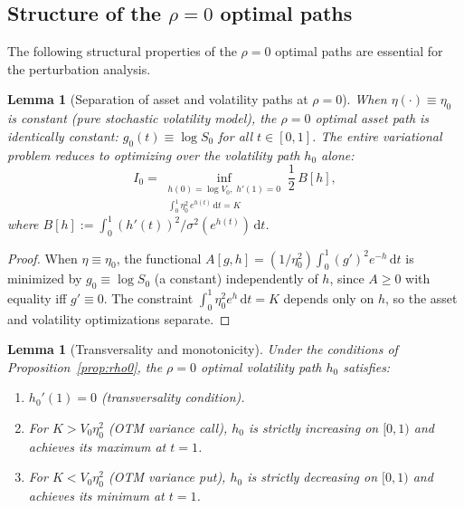 \documentclass[11pt]{article}
\newtheorem{lemma}[theorem]{Lemma}
\theoremstyle{definition}
\newcommand{\dd}{\mathrm{d}}
\begin{document}
\subsection{Structure of the $\rho=0$ optimal paths}\label{sec:rho0_structure}

The following structural properties of the $\rho=0$ optimal paths are essential for the perturbation analysis.

\begin{lemma}[Separation of asset and volatility paths at $\rho=0$]\label{lem:separation}
When $\eta(\cdot) \equiv \eta_0$ is constant (pure stochastic volatility model), the $\rho=0$ optimal asset path is identically constant: $g_0(t) \equiv \log S_0$ for all $t \in [0,1]$. The entire variational problem reduces to optimizing over the volatility path $h_0$ alone:
\begin{equation}\label{eq:reduced_var}
  I_0 = \inf_{\substack{h(0) = \log V_0,\; h'(1) = 0 \\ \int_0^1 \eta_0^2\,e^{h(t)}\,\dd t = K}} \frac{1}{2}\,B[h],
\end{equation}
where $B[h] := \int_0^1 (h'(t))^2/\sigma^2(e^{h(t)})\,\dd t$.
\end{lemma}

\begin{proof}
When $\eta \equiv \eta_0$, the functional $A[g,h] = (1/\eta_0^2)\int_0^1 (g')^2 e^{-h}\,\dd t$ is minimized by $g_0 \equiv \log S_0$ (a constant) independently of $h$, since $A \geq 0$ with equality iff $g' \equiv 0$. The constraint $\int_0^1 \eta_0^2 e^{h}\,\dd t = K$ depends only on $h$, so the asset and volatility optimizations separate.
\end{proof}

\begin{lemma}[Transversality and monotonicity]\label{lem:transversality}
Under the conditions of Proposition~\ref{prop:rho0}, the $\rho=0$ optimal volatility path $h_0$ satisfies:
\begin{enumerate}[label=(\alph*)]
  \item $h_0'(1) = 0$ (transversality condition).
  \item For $K > V_0\eta_0^2$ (OTM variance call), $h_0$ is strictly increasing on $[0,1)$ and achieves its maximum at $t=1$.
  \item For $K < V_0\eta_0^2$ (OTM variance put), $h_0$ is strictly decreasing on $[0,1)$ and achieves its minimum at $t=1$.
\end{enumerate}
\end{lemma}
\end{document}
